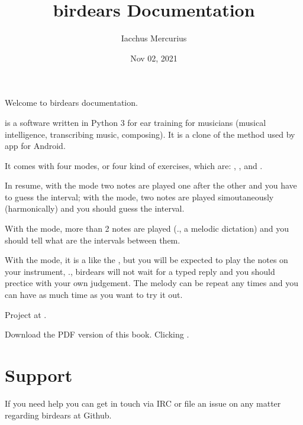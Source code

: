 \documentclass[letterpaper,10pt,english]{sphinxmanual}
\title{birdears Documentation}
\date{Nov 02, 2021}
\author{Iacchus Mercurius}
\begin{document}
\pagestyle{empty}
\sphinxmaketitle
\pagestyle{plain}
\sphinxtableofcontents
\pagestyle{normal}
\label{\detokenize{index::doc}}


\sphinxAtStartPar
Welcome to birdears documentation.

\sphinxAtStartPar
{} is a software written in Python 3 for ear training for
musicians (musical intelligence, transcribing music, composing). It is a
clone of the method used by 
app for Android.

\sphinxAtStartPar
It comes with four modes, or four kind of exercises, which are:
, ,  and .

\sphinxAtStartPar
In resume, with the  mode two notes are played one after the
other and you have to guess the interval; with the  mode,
two notes are played simoutaneously (harmonically) and you should guess
the interval.

\sphinxAtStartPar
With the  mode, more than 2 notes are played (., a
melodic dictation) and you should tell what are the intervals between
them.

\sphinxAtStartPar
With the  mode, it is a like the , but you will
be expected to play the notes on your instrument, ., birdears will
not wait for a typed reply and you should prectice with your own
judgement. The melody can be repeat any times and you can have as much
time as you want to try it out.

\sphinxAtStartPar
Project at .

\sphinxAtStartPar
Download the PDF version of this book. Clicking .




\chapter{Support}
\label{\detokenize{community:support}}\label{\detokenize{community::doc}}
\sphinxAtStartPar
If you need help you can get in touch via IRC or file an issue on any matter regarding birdears at Github.
\end{document}
